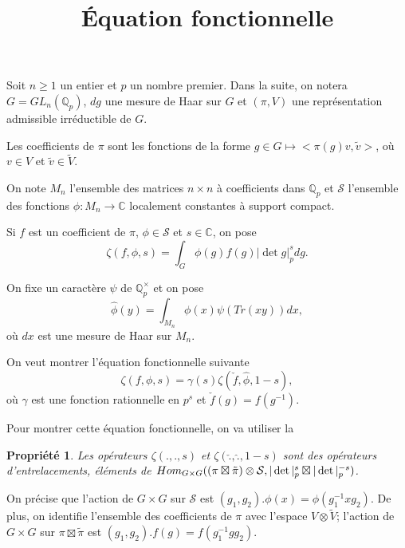 \documentclass{amsart}
\newtheorem{propriete}{Propriété}
\DeclareMathOperator{\Hom}{\mathnormal{Hom}}
\begin{document}
\title{Équation fonctionnelle}
\maketitle

%
%

Soit $n \geq 1$ un entier et $p$ un nombre premier. Dans la suite, on notera $G = GL_n(\mathbb{Q}_p)$, $dg$ une mesure de Haar sur $G$ et $(\pi, V)$ une représentation admissible irréductible de $G$.

Les coefficients de $\pi$ sont les fonctions de la forme $g \in G \mapsto <\pi(g)v, \tilde{v}>$, où $v \in V$ et $\tilde{v} \in \tilde{V}$.

On note $M_n$ l'ensemble des matrices $n \times n$ à coefficients dans $\mathbb{Q}_p$ et $\mathcal{S}$ l'ensemble des fonctions $\phi : M_n \rightarrow \mathbb{C}$ localement constantes à support compact.

Si $f$ est un coefficient de $\pi$, $\phi \in \mathcal{S}$ et $s \in \mathbb{C}$, on pose
\begin{equation}
\zeta(f, \phi, s) = \int_G \phi(g)f(g)|\det g|_p^s dg.
\end{equation}

On fixe un caractère $\psi$ de $\mathbb{Q}_p^\times$ et on pose
\begin{equation}
\hat{\phi}(y) = \int_{M_n} \phi(x) \psi(Tr(xy)) dx,
\end{equation}
où $dx$ est une mesure de Haar sur $M_n$.

On veut montrer l'équation fonctionnelle suivante
\begin{equation}
\zeta(f, \phi, s) = \gamma(s) \zeta(\check{f}, \hat{\phi}, 1-s),
\end{equation}
où $\gamma$ est une fonction rationnelle en $p^s$ et $\check{f}(g) = f(g^{-1})$.

Pour montrer cette équation fonctionnelle, on va utiliser la
\begin{propriete}
Les opérateurs $\zeta(., ., s)$ et $\zeta(\check{.}, \hat{.}, 1-s)$ sont des opérateurs d'entrelacements, éléments de $\Hom_{G \times G} ( (\pi \boxtimes \tilde{\pi}) \otimes \mathcal{S}, |\det|_p^s \boxtimes |\det|_p^{-s})$.
\end{propriete}

On précise que l'action de $G \times G$ sur $\mathcal{S}$ est
$(g_1,g_2).\phi(x) = \phi(g_1^{-1} x g_2)$. De plus, on identifie l'ensemble des coefficients de $\pi$ avec l'espace $V\otimes \tilde{V}$; l'action de $G \times G$ sur $\pi \boxtimes \tilde{\pi}$ est $(g_1,g_2).f(g) = f(g_1^{-1} g g_2)$.
\end{document}

